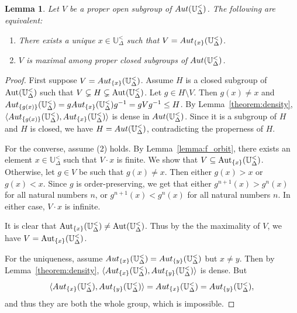 \documentclass{amsart}
\newtheorem{lemma}[theorem]{Lemma}
\theoremstyle{definition}
\theoremstyle{remark}
\begin{document}
     \begin{lemma}\label{lem:maxopen}
        Let $V$ be a proper open subgroup of ${\rm Aut}(\mathbb{U}_{\Delta}^<)$. The following are equivalent:
        \begin{enumerate}
           \item[\rm (1)] There exists a unique $x \in \mathbb{U}_{\Delta}^<$ such that $V = {\rm Aut}_{\{x\}}(\mathbb{U}_{\Delta}^<)$. 
           \item[\rm (2)] $V$ is maximal among proper closed subgroups of ${\rm Aut}(\mathbb{U}_{\Delta}^<)$. 
        \end{enumerate}
        \end{lemma}
\begin{proof}
           First suppose $V = {\rm Aut}_{\{x\}}(\mathbb{U}_{\Delta}^<)$. Assume $H$ is a closed subgroup of $\mbox{\rm Aut}(\mathbb{U}^<_\Delta)$ such that $V\subsetneq H\subsetneq \mbox{\rm Aut}(\mathbb{U}^<_\Delta)$.  Let $g \in H \setminus V$. Then $g(x) \neq x$ and ${\rm Aut}_{\{g(x)\}}(\mathbb{U}_{\Delta}^<) = g{\rm Aut}_{\{x\}}(\mathbb{U}_{\Delta}^<)g^{-1}=gVg^{-1} \leq H$. By Lemma~\ref{theorem:density}, $\langle {\rm Aut}_{\{g(x)\}}(\mathbb{U}_{\Delta}^<), {\rm Aut}_{\{x\}}(\mathbb{U}_{\Delta}^<) \rangle$ is dense in ${\rm Aut}(\mathbb{U}_{\Delta}^<)$. Since it is a subgroup of $H$ and $H$ is closed, we have $H= {\rm Aut}(\mathbb{U}_{\Delta}^<)$, contradicting the properness of $H$. 
     
           For the converse, assume (2) holds. By Lemma~\ref{lemma:f_orbit}, there exists an element $x \in \mathbb{U}_{\Delta}^<$ such that $V\cdot x$ is finite. We show that $V\subseteq \mbox{\rm Aut}_{\{x\}}(\mathbb{U}^<_\Delta)$. Otherwise, let $g \in V$ be such that $g(x) \neq x$. Then either $g(x)>x$ or $g(x)<x$. Since $g$ is order-preserving, we get that either $g^{n+1}(x) > g^n(x)$ for all natural numbers $n$, or $g^{n+1}(x)<g^n(x)$ for all natural numbers $n$. In either case, $V\cdot x$ is infinite. 
           
It is clear that $\mbox{\rm Aut}_{\{x\}}(\mathbb{U}^<_\Delta)\neq \mbox{\rm Aut}(\mathbb{U}^<_\Delta)$. Thus by the the maximality of $V$, we have
$V=\mbox{\rm Aut}_{\{x\}}(\mathbb{U}^<_\Delta)$.
     
           For the uniqueness, assume ${\rm Aut}_{\{x\}}(\mathbb{U}_{\Delta}^<) = {\rm Aut}_{\{y\}}(\mathbb{U}_{\Delta}^<)$ but $x \neq y$. Then by Lemma~\ref{theorem:density}, $\langle {\rm Aut}_{\{x\}}(\mathbb{U}_{\Delta}^<), {\rm Aut}_{\{y\}}(\mathbb{U}_{\Delta}^<) \rangle$ is dense. But $$\langle {\rm Aut}_{\{x\}}(\mathbb{U}_{\Delta}^<), {\rm Aut}_{\{y\}}(\mathbb{U}_{\Delta}^<) \rangle={\rm Aut}_{\{x\}}(\mathbb{U}_{\Delta}^<) = {\rm Aut}_{\{y\}}(\mathbb{U}_{\Delta}^<),$$ and thus they are both the whole group, which is impossible. 
        \end{proof}
     
\end{document}
